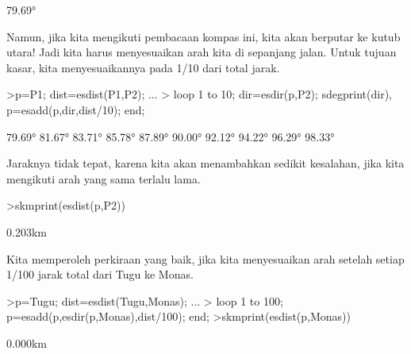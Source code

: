 \documentclass[a4paper,10pt]{article}
\begin{document}
\begin{eulernotebook}
\begin{eulercomment}
\begin{eulercomment}
\begin{eulercomment}
\begin{eulercomment}
\begin{eulercomment}
\begin{eulercomment}
\begin{eulercomment}
\begin{eulercomment}
\begin{eulercomment}
\begin{eulercomment}
\begin{eulercomment}
\begin{eulercomment}
\begin{eulercomment}
\begin{eulercomment}
\begin{eulercomment}
\begin{eulercomment}
\begin{eulercomment}
\begin{eulercomment}
\begin{eulercomment}
\begin{eulercomment}
\begin{eulercomment}
\begin{eulercomment}
\begin{eulercomment}
\begin{eulercomment}
\begin{eulercomment}
\begin{eulercomment}
\begin{eulercomment}
\begin{eulercomment}
\begin{eulercomment}
\begin{eulercomment}
\begin{euleroutput}
       79.69°
\end{euleroutput}
\begin{eulercomment}
Namun, jika kita mengikuti pembacaan kompas ini, kita akan berputar ke
kutub utara! Jadi kita harus menyesuaikan arah kita di sepanjang
jalan. Untuk tujuan kasar, kita menyesuaikannya pada 1/10 dari total
jarak.
\end{eulercomment}
\begin{eulerprompt}
>p=P1;  dist=esdist(P1,P2); ...
>  loop 1 to 10; dir=esdir(p,P2); sdegprint(dir), p=esadd(p,dir,dist/10); end;
\end{eulerprompt}
\begin{euleroutput}
       79.69°
       81.67°
       83.71°
       85.78°
       87.89°
       90.00°
       92.12°
       94.22°
       96.29°
       98.33°
\end{euleroutput}
\begin{eulercomment}
Jaraknya tidak tepat, karena kita akan menambahkan sedikit kesalahan,
jika kita mengikuti arah yang sama terlalu lama.
\end{eulercomment}
\begin{eulerprompt}
>skmprint(esdist(p,P2))
\end{eulerprompt}
\begin{euleroutput}
       0.203km
\end{euleroutput}
\begin{eulercomment}
Kita memperoleh perkiraan yang baik, jika kita menyesuaikan arah
setelah setiap 1/100 jarak total dari Tugu ke Monas.
\end{eulercomment}
\begin{eulerprompt}
>p=Tugu; dist=esdist(Tugu,Monas); ...
>  loop 1 to 100; p=esadd(p,esdir(p,Monas),dist/100); end;
>skmprint(esdist(p,Monas))
\end{eulerprompt}
\begin{euleroutput}
       0.000km
\end{euleroutput}
\begin{eulercomment}

\end{eulercomment}
\end{eulercomment}
\end{eulercomment}
\end{eulercomment}
\end{eulercomment}
\end{eulercomment}
\end{eulercomment}
\end{eulercomment}
\end{eulercomment}
\end{eulercomment}
\end{eulercomment}
\end{eulercomment}
\end{eulercomment}
\end{eulercomment}
\end{eulercomment}
\end{eulercomment}
\end{eulercomment}
\end{eulercomment}
\end{eulercomment}
\end{eulercomment}
\end{eulercomment}
\end{eulercomment}
\end{eulercomment}
\end{eulercomment}
\end{eulercomment}
\end{eulercomment}
\end{eulercomment}
\end{eulercomment}
\end{eulercomment}
\end{eulercomment}
\end{eulercomment}
\end{eulernotebook}
\end{document}
